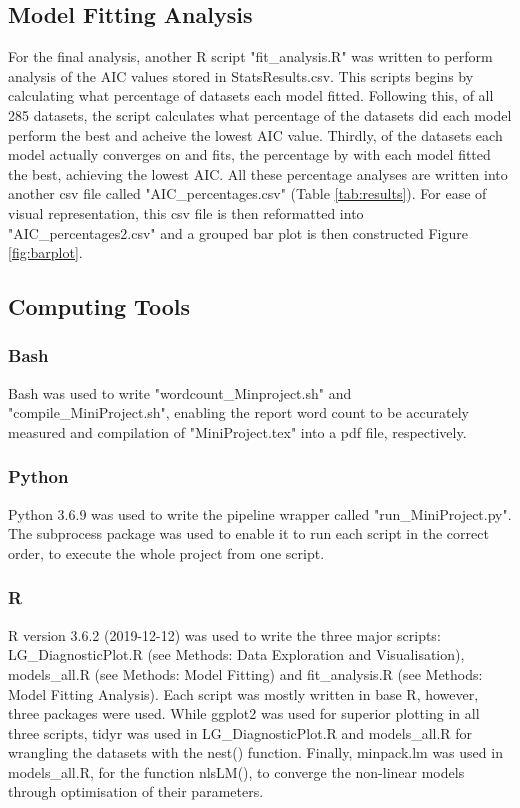 \documentclass[11pt, a4paper]{article} %
\begin{document}
\subsection{Model Fitting Analysis}

For the final analysis, another R script "fit\_analysis.R" was written to perform analysis of the AIC values stored in StatsResults.csv. This scripts begins by calculating what percentage of datasets each model fitted. Following this, of all 285 datasets, the script calculates what percentage of the datasets did each model perform the best and acheive the lowest AIC value. Thirdly, of the datasets each model actually converges on and fits, the percentage by with each model fitted the best, achieving the lowest AIC. All these percentage analyses are written into another csv file called "AIC\_percentages.csv" (Table \ref{tab:results}). For ease of visual representation, this csv file is then reformatted into "AIC\_percentages2.csv" and a grouped bar plot is then constructed Figure \ref{fig:barplot}. 

\subsection{Computing Tools} 

\subsubsection{Bash}

Bash was used to write "wordcount\_Minproject.sh" and "compile\_MiniProject.sh", enabling the report word count to be accurately measured and compilation of "MiniProject.tex" into a pdf file, respectively.

\subsubsection{Python}

Python 3.6.9 was used to write the pipeline wrapper called "run\_MiniProject.py". The subprocess package was used to enable it to run each script in the correct order, to execute the whole project from one script.

\subsubsection{R}

R version 3.6.2 (2019-12-12) was used to write the three major scripts: LG\_DiagnosticPlot.R (see Methods: Data Exploration and Visualisation), models\_all.R (see Methods: Model Fitting) and fit\_analysis.R (see Methods: Model Fitting Analysis). Each script was mostly written in base R, however, three packages were used. While ggplot2 was used for superior plotting in all three scripts, tidyr was used in LG\_DiagnosticPlot.R and models\_all.R for wrangling the datasets with the nest() function. Finally, minpack.lm was used in models\_all.R, for the function nlsLM(), to converge the non-linear models through optimisation of their parameters.
\end{document}
